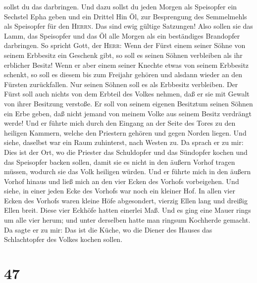 sollst du das darbringen.  Und dazu sollst du jeden
Morgen als Speisopfer ein Sechstel Epha geben und ein Drittel Hin Öl,
zur Besprengung des Semmelmehls als Speisopfer für den \textsc{Herrn}.
Das sind ewig gültige Satzungen!  Also sollen sie das
Lamm, das Speisopfer und das Öl alle Morgen als ein beständiges
Brandopfer darbringen.  So spricht Gott, der
\textsc{Herr}: Wenn der Fürst einem seiner Söhne von seinem Erbbesitz
ein Geschenk gibt, so soll es seinen Söhnen verbleiben als ihr erblicher
Besitz!  Wenn er aber einem seiner Knechte etwas von
seinem Erbbesitz schenkt, so soll es diesem bis zum Freijahr gehören und
alsdann wieder an den Fürsten zurückfallen. Nur seinen Söhnen soll es
als Erbbesitz verbleiben.  Der Fürst soll auch nichts von
dem Erbteil des Volkes nehmen, daß er sie mit Gewalt von ihrer Besitzung
verstoße. Er soll von seinem eigenen Besitztum seinen Söhnen ein Erbe
geben, daß nicht jemand von meinem Volke aus seinem Besitz verdrängt
werde!  Und er führte mich durch den Eingang an der Seite
des Tores zu den heiligen Kammern, welche den Priestern gehören und
gegen Norden liegen. Und siehe, daselbst war ein Raum zuhinterst, nach
Westen zu.  Da sprach er zu mir: Dies ist der Ort, wo die
Priester das Schuldopfer und das Sündopfer kochen und das Speisopfer
backen sollen, damit sie es nicht in den äußern Vorhof tragen müssen,
wodurch sie das Volk heiligen würden.  Und er führte mich
in den äußern Vorhof hinaus und ließ mich an den vier Ecken des Vorhofs
vorbeigehen. Und siehe, in einer jeden Ecke des Vorhofs war noch ein
kleiner Hof.  In allen vier Ecken des Vorhofs waren
kleine Höfe abgesondert, vierzig Ellen lang und dreißig Ellen breit.
Diese vier Eckhöfe hatten einerlei Maß.  Und es ging eine
Mauer rings um alle vier herum; und unter derselben hatte man ringsum
Kochherde gemacht.  Da sagte er zu mir: Das ist die
Küche, wo die Diener des Hauses das Schlachtopfer des Volkes kochen
sollen.

\hypertarget{section-46}{%
\section{47}\label{section-46}}

